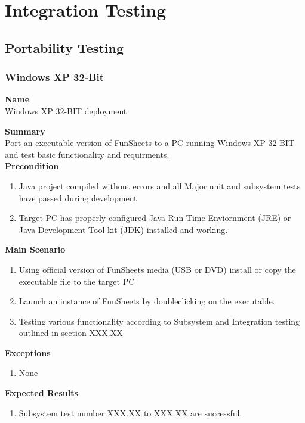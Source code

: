 \documentclass[12pt]{article}
\begin{document}
\section{Integration Testing}

\subsection{Portability Testing}

\subsubsection{Windows XP 32-Bit} \label{uc:1}

\noindent
{\bf Name}\\
Windows XP 32-BIT deployment

\noindent
{\bf Summary}\\
Port an executable version of FunSheets to a PC running Windows XP 32-BIT and test basic functionality and requirments.
\noindent\\
{\bf Precondition}\
\begin{enumerate}
\item Java project compiled without errors and all Major unit and subsystem tests have passed during development
\item Target PC has properly configured Java Run-Time-Enviornment (JRE) or Java Development Tool-kit (JDK) installed and working.
\end{enumerate}

\noindent
{\bf Main Scenario}\
\vspace*{-0.2in}
\begin{enumerate}
\item Using official version of FunSheets media (USB or DVD) install or copy the executable file to the target PC
\item Launch an instance of FunSheets by doubleclicking on the executable.
\item Testing various functionality according to Subsystem and Integration testing outlined in section XXX.XX
\end{enumerate}

{\bf Exceptions}\
\begin{enumerate}
\item None
\end{enumerate}
{\bf Expected Results}\
\begin{enumerate}
\item Subsystem test number XXX.XX to XXX.XX are successful.
\end{enumerate}
\end{document}

